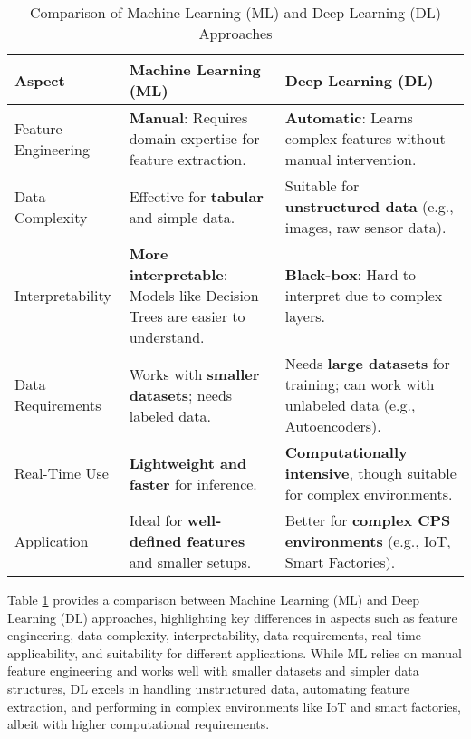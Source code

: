 \begin{table}[h!]
\centering
\caption{Comparison of Machine Learning (ML) and Deep Learning (DL) Approaches}
\label{tab:ml_dl_comparison}
\renewcommand{\arraystretch}{1.5}
    \begin{tabular}{>{\raggedright\arraybackslash}m{2cm}>{\raggedright\arraybackslash}m{3cm}>{\raggedright\arraybackslash}m{3cm}}
        \hline
        \textbf{Aspect} & \textbf{Machine Learning (ML)} & \textbf{Deep Learning (DL)} \\ \hline

        Feature Engineering & \textbf{Manual}: Requires domain expertise for feature extraction. & \textbf{Automatic}: Learns complex features without manual intervention. \\ 
        \rowcolor[HTML]{EFEFEF}
        Data Complexity & Effective for \textbf{tabular} and simple data. & Suitable for \textbf{unstructured data} (e.g., images, raw sensor data). \\ 
        Interpretability & \textbf{More interpretable}: Models like Decision Trees are easier to understand. & \textbf{Black-box}: Hard to interpret due to complex layers. \\ 
        \rowcolor[HTML]{EFEFEF}
        Data Requirements & Works with \textbf{smaller datasets}; needs labeled data. & Needs \textbf{large datasets} for training; can work with unlabeled data (e.g., Autoencoders). \\ 
        Real-Time Use & \textbf{Lightweight and faster} for inference. & \textbf{Computationally intensive}, though suitable for complex environments. \\ 
        \rowcolor[HTML]{EFEFEF}
        Application & Ideal for \textbf{well-defined features} and smaller setups. & Better for \textbf{complex CPS environments} (e.g., IoT, Smart Factories). \\ \hline
    \end{tabular}
\end{table}
Table \ref{tab:ml_dl_comparison} provides a comparison between Machine Learning (ML) and Deep Learning (DL) approaches, highlighting key differences in aspects such as feature engineering, data complexity, interpretability, data requirements, real-time applicability, and suitability for different applications. While ML relies on manual feature engineering and works well with smaller datasets and simpler data structures, DL excels in handling unstructured data, automating feature extraction, and performing in complex environments like IoT and smart factories, albeit with higher computational requirements.
